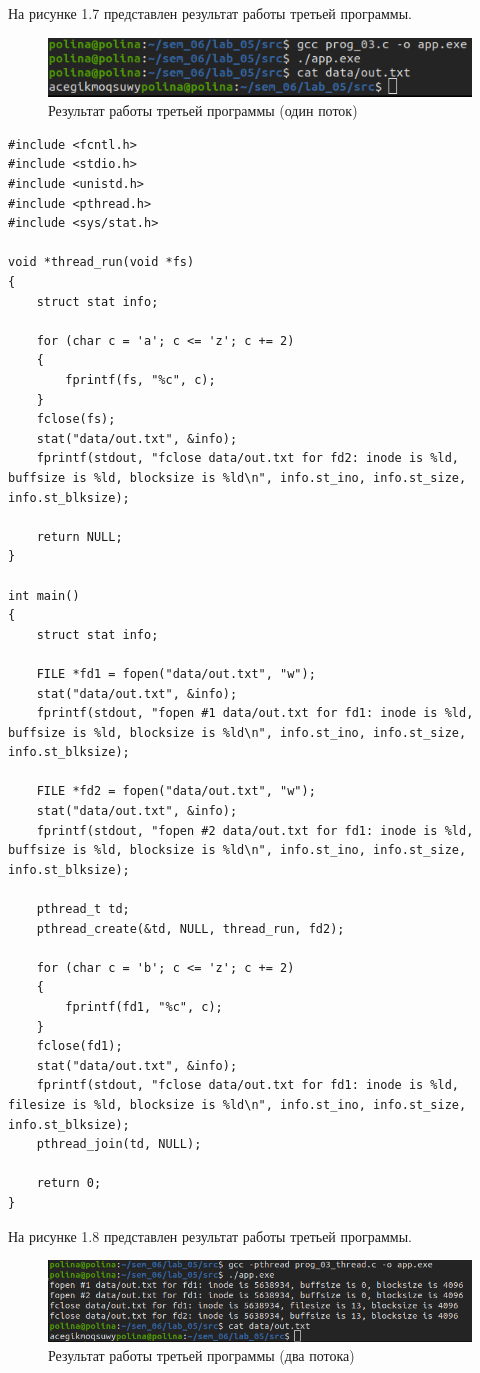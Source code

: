 \documentclass[12pt,a4paper]{scrreprt}
\begin{document}
На рисунке 1.7 представлен результат работы третьей программы.

\begin{figure}[H]
	\centering
	\includegraphics[scale=1.2]{pics/3_1.png}
	\caption{Результат работы третьей программы (один поток)}
\end{figure}

\begin{lstlisting}[caption=Программа №3 (два потока)]
#include <fcntl.h>
#include <stdio.h>
#include <unistd.h>
#include <pthread.h>
#include <sys/stat.h>

void *thread_run(void *fs)
{
	struct stat info;
	
	for (char c = 'a'; c <= 'z'; c += 2)
	{
		fprintf(fs, "%c", c);
	}
	fclose(fs);
	stat("data/out.txt", &info);
	fprintf(stdout, "fclose data/out.txt for fd2: inode is %ld, buffsize is %ld, blocksize is %ld\n", info.st_ino, info.st_size, info.st_blksize);
	
	return NULL;
}

int main()
{
	struct stat info;
	
	FILE *fd1 = fopen("data/out.txt", "w");
	stat("data/out.txt", &info);
	fprintf(stdout, "fopen #1 data/out.txt for fd1: inode is %ld, buffsize is %ld, blocksize is %ld\n", info.st_ino, info.st_size, info.st_blksize);
	
	FILE *fd2 = fopen("data/out.txt", "w");
	stat("data/out.txt", &info);
	fprintf(stdout, "fopen #2 data/out.txt for fd1: inode is %ld, buffsize is %ld, blocksize is %ld\n", info.st_ino, info.st_size, info.st_blksize);
	
	pthread_t td;
	pthread_create(&td, NULL, thread_run, fd2);
	
	for (char c = 'b'; c <= 'z'; c += 2)
	{
		fprintf(fd1, "%c", c);
	}
	fclose(fd1);
	stat("data/out.txt", &info);
	fprintf(stdout, "fclose data/out.txt for fd1: inode is %ld, filesize is %ld, blocksize is %ld\n", info.st_ino, info.st_size, info.st_blksize);
	pthread_join(td, NULL);
	
	return 0;
}
\end{lstlisting}

На рисунке 1.8 представлен результат работы третьей программы.

\begin{figure}[H]
	\centering
	\includegraphics[scale=0.8]{pics/3_2.png}
	\caption{Результат работы третьей программы (два потока)}
\end{figure}
\end{document}
